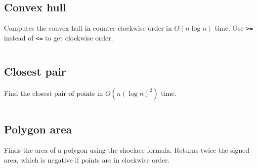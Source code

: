 \documentclass[10pt,a4paper,landscape,oneside]{amsart}
\newcommand{\code}[1]{\inputminted[fontsize=\large,tabsize=2,baselinestretch=1]{java}{#1}}
\begin{document}
\begin{multicols*}{2}
\subsection{Convex hull}
Computes the convex hull in counter clockwise order in \(O(n \log n)\) time.
Use \verb|>=| instead of \verb|<=| to get clockwise order.
\code{geometry/convex-hull.java}
\subsection{Closest pair}
Find the closest pair of points in \(O(n (\log n)^2)\) time.
\code{geometry/closest-pair.java}
\subsection{Polygon area}
Finds the area of a polygon using the shoelace formula. Returns twice the signed area,
which is negative if points are in clockwise order.
\code{geometry/polygon-area.java}

\end{multicols*}
\end{document}

